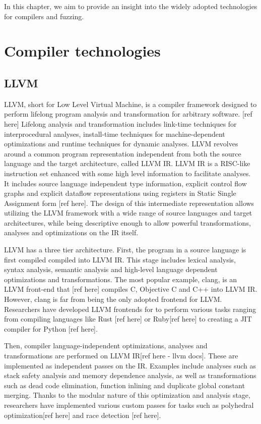 In this chapter, we aim to provide an insight into the widely adopted technologies for compilers and fuzzing.

\section{Compiler technologies}
\subsection{LLVM}
LLVM, short for Low Level Virtual Machine, is a compiler framework designed to perform lifelong program analysis and transformation for arbitrary software. [ref here]
Lifelong analysis and transformation includes link-time techniques for interprocedural analyses, install-time techniques for machine-dependent optimizations and runtime techniques for dynamic analyses.
LLVM revolves around a common program representation independent from both the source language and the target architecture, called LLVM IR.
LLVM IR is a RISC-like instruction set enhanced with some high level information to facilitate analyses.
It includes source language independent type information, explicit control flow graphs and explicit dataflow representations using registers in Static Single Assignment form [ref here].
The design of this intermediate representation allows utilizing the LLVM framework with a wide range of source languages and target architectures, while being descriptive enough to allow powerful transformations, analyses and optimizations on the IR itself.

LLVM has a three tier architecture. First, the program in a source language is first compiled compiled into LLVM IR.
This stage includes lexical analysis, syntax analysis, semantic analysis and high-level language dependent optimizations and transformations.
The most popular example, clang, is an LLVM front-end that [ref here] compiles C, Objective C and C++ into LLVM IR.
However, clang is far from being the only adopted frontend for LLVM.
Researchers have developed LLVM frontends for to perform various tasks ranging from compiling languages like Rust [ref here] or Ruby[ref here] to creating a JIT compiler for Python [ref here].

Then, compiler language-independent optimizations, analyses and transformations are performed on LLVM IR[ref here - llvm docs].
These are implemented as independent passes on the IR.
Examples include analyses such as stack safety analysis and memory dependence analysis, as well as 
transformations such as dead code elimination, function inlining and duplicate global constant merging.
Thanks to the modular nature of this optimization and analysis stage, researchers have implemented various custom passes for tasks such as polyhedral optimization[ref here] and race detection [ref here]. 

